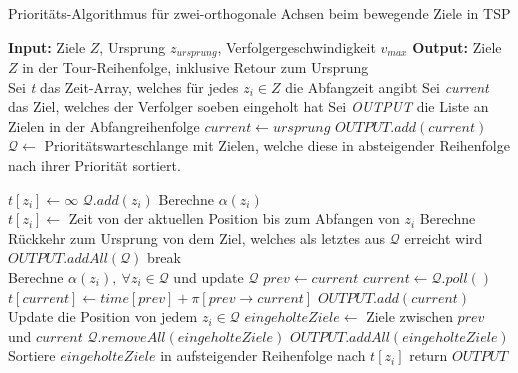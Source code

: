 \documentclass[german,version-2019-11]{uzl-thesis}
\begin{document}
\begin{minipage}{1\linewidth}
\begin{algorithm}[H]
\begin{algorithmic}
\caption{Prioritäts-Algorithmus für zwei-orthogonale Achsen beim bewegende Ziele in TSP}
\label{alg:2OA.1}
\State \textbf{Input:} Ziele $Z$, Ursprung $z_{ursprung}$, Verfolgergeschwindigkeit $v_{max}$
\State \textbf{Output:} Ziele $Z$ in der Tour-Reihenfolge, inklusive Retour zum Ursprung\\

\State Sei \emph{t} das Zeit-Array, welches für jedes $z_i\in Z$ die Abfangzeit angibt
\State Sei \emph{current} das Ziel, welches der Verfolger soeben eingeholt hat
\State Sei \emph{OUTPUT} die Liste an Zielen in der Abfangreihenfolge
\State $current\leftarrow ursprung$
\State $OUTPUT.add(current)$
\State $\mathcal{Q} \leftarrow$ Prioritätswarteschlange mit Zielen, welche diese in absteigender Reihenfolge nach ihrer Priorität sortiert. 

\State $t[z_i] \leftarrow \infty$
\State $\mathcal{Q}.add(z_i)$
\State Berechne $\alpha(z_i)$
\EndFor\\

\State $t[z_i] \leftarrow$ Zeit von der aktuellen Position bis zum Abfangen von $z_i$
\EndFor
\State Berechne Rückkehr zum Ursprung von dem Ziel, welches als letztes aus $\mathcal{Q}$
\State erreicht wird
\State $OUTPUT.addAll(\mathcal{Q})$
\State break
\EndIf \\

\State Berechne $\alpha(z_i),~\forall z_i\in\mathcal{Q}$ und update $\mathcal{Q}$
\State $prev\leftarrow current$
\State $current \leftarrow \mathcal{Q}.poll()$
\State $t[current] \leftarrow time[prev] + \pi[prev\rightarrow current]$
\State $OUTPUT.add(current)$
\State Update die Position von jedem $z_i\in\mathcal{Q}$
\State $eingeholteZiele \leftarrow$ Ziele zwischen $prev$ und $current$
\State $\mathcal{Q}.removeAll(eingeholteZiele)$
\State $OUTPUT.addAll(eingeholteZiele)$
\EndWhile\\

\State Sortiere $eingeholteZiele$ in aufsteigender Reihenfolge nach $t[z_i]$
\State return $OUTPUT$
\end{algorithmic}
\end{algorithm}
\end{minipage}
\end{document}

